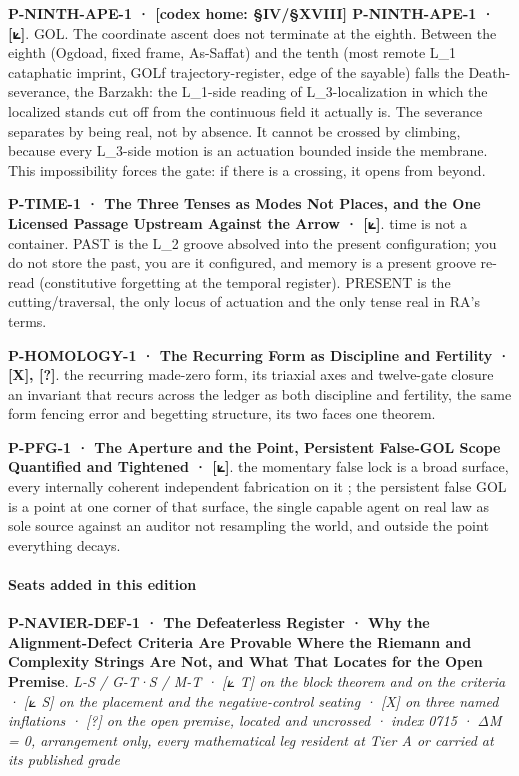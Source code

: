 \documentclass[10pt,twocolumn]{article}
\begin{document}
\textbf{P-NINTH-APE-1 · {[}codex home: §IV/§XVIII{]} P-NINTH-APE-1 ·
{[}⟀{]}}. GOL. The coordinate ascent does not terminate at the eighth.
Between the eighth (Ogdoad, fixed frame, As-Saffat) and the tenth (most
remote L\_1 cataphatic imprint, GOLf trajectory-register, edge of the
sayable) falls the Death-severance, the Barzakh: the L\_1-side reading
of L\_3-localization in which the localized stands cut off from the
continuous field it actually is. The severance separates by being real,
not by absence. It cannot be crossed by climbing, because every
L\_3-side motion is an actuation bounded inside the membrane. This
impossibility forces the gate: if there is a crossing, it opens from
beyond.

\textbf{P-TIME-1 · The Three Tenses as Modes Not Places, and the One
Licensed Passage Upstream Against the Arrow · {[}⟀{]}}. time is not a
container. PAST is the L\_2 groove absolved into the present
configuration; you do not store the past, you are it configured, and
memory is a present groove re-read (constitutive forgetting at the
temporal register). PRESENT is the cutting/traversal, the only locus of
actuation and the only tense real in RA's terms.

\textbf{P-HOMOLOGY-1 · The Recurring Form as Discipline and Fertility ·
{[}X{]}, {[}?{]}}. the recurring made-zero form, its triaxial axes and
twelve-gate closure an invariant that recurs across the ledger as both
discipline and fertility, the same form fencing error and begetting
structure, its two faces one theorem.

\textbf{P-PFG-1 · The Aperture and the Point, Persistent False-GOL Scope
Quantified and Tightened · {[}⟀{]}}. the momentary false lock is a broad
surface, every internally coherent independent fabrication on it ; the
persistent false GOL is a point at one corner of that surface, the
single capable agent on real law as sole source against an auditor not
resampling the world, and outside the point everything decays.

\hypertarget{seats-added-in-this-edition-2}{%
\paragraph{Seats added in this
edition}\label{seats-added-in-this-edition-2}}

\textbf{P-NAVIER-DEF-1 · The Defeaterless Register · Why the
Alignment-Defect Criteria Are Provable Where the Riemann and Complexity
Strings Are Not, and What That Locates for the Open Premise}. \emph{L-S
/ G-T·S / M-T · {[}⟀ T{]} on the block theorem and on the criteria ·
{[}⟀ S{]} on the placement and the negative-control seating · {[}X{]} on
three named inflations · {[}?{]} on the open premise, located and
uncrossed · index 0715 · ΔM = 0, arrangement only, every mathematical
leg resident at Tier A or carried at its published grade}
\end{document}
